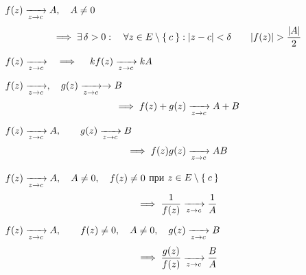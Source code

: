 \begin{stmts}
	\item \label{en:stmt:lim:1} $ f(z) \xrightarrow[z \to c]{} A, \quad A \ne 0 $
	$$ \implies \exists\, \delta > 0 : \quad \forall z \in E \setminus \Set{c} : |z - c| < \delta \qquad |f(z)| > \frac{|A|}2 $$

	\item $ f(z) \xrightarrow[z \to c]{} \quad \implies \quad kf(z) \xrightarrow[z \to c]{} kA $

	\item $ f(z) \xrightarrow[z \to c]{}, \quad g(z) \xrightarrow[z \to c]{} \to B $
	$$ \implies f(z) + g(z) \xrightarrow[z \to c]{} A + B $$

	\item $ f(z) \xrightarrow[z \to c]{} A, \qquad g(z) \xrightarrow[z \to c]{} B $
	$$ \implies f(z)g(z) \xrightarrow[z \to c]{} AB $$

	\item $ f(z) \xrightarrow[z \to c]{} A, \quad A \ne 0, \quad f(z) \ne 0 $ при $ z \in E \setminus \Set c $
	$$ \implies \frac1{f(z)} \xrightarrow[z \to c]{} \frac1A $$

	\item $ f(z) \xrightarrow[z \to c]{} A, \qquad f(z) \ne 0, \quad A \ne 0, \quad g(z) \xrightarrow[z \to c]{} B $
	$$ \implies \frac{g(z)}{f(z)} \xrightarrow[z \to c]{} \frac BA $$
\end{stmts}

